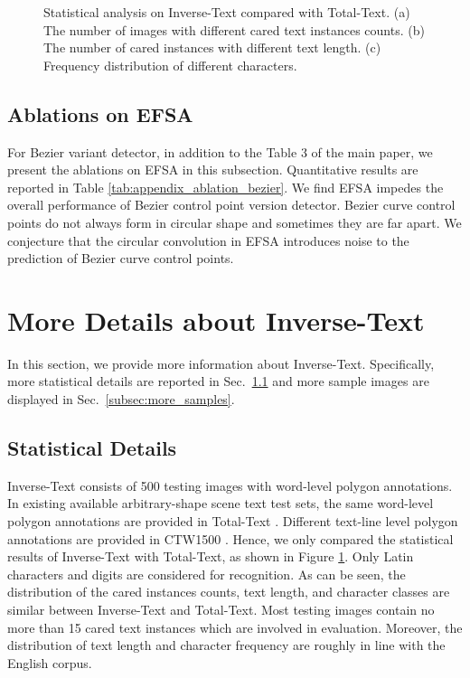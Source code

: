 \documentclass[letterpaper]{article} \usepackage{aaai23}  \usepackage{times}  \usepackage{helvet}  \usepackage{courier}  \usepackage[hyphens]{url}  \usepackage{graphicx} \urlstyle{rm}
\begin{document}
\begin{figure}[!t]
    \centering
    \caption{Statistical analysis on Inverse-Text compared with Total-Text. (a) The number of images with different cared text instances counts. (b) The number of cared instances with different text length. (c) Frequency distribution of different characters.}
    \label{fig:appendix_statistic}
\end{figure}

\subsection{Ablations on EFSA}
For Bezier variant detector, in addition to the Table 3 of the main paper, we present the ablations on EFSA in this subsection. Quantitative results are reported in Table \ref{tab:appendix_ablation_bezier}. We find EFSA impedes the overall performance of Bezier control point version detector. Bezier curve control points do not always form in circular shape and sometimes they are far apart. We conjecture that the circular convolution in EFSA introduces noise to the prediction of Bezier curve control points.

\section{More Details about Inverse-Text}
In this section, we provide more information about Inverse-Text. Specifically, more statistical details are reported in Sec.~\ref{subsec:more_details} and more sample images are displayed in Sec.~\ref{subsec:more_samples}.

\subsection{Statistical Details}
\label{subsec:more_details}
Inverse-Text consists of 500 testing images with word-level polygon annotations. In existing available arbitrary-shape scene text test sets, the same word-level polygon annotations are provided in Total-Text \cite{ch2020total}. Different text-line level polygon annotations are provided in CTW1500 \cite{liu2019curved}. Hence, we only compared the statistical results of Inverse-Text with Total-Text, as shown in Figure \ref{fig:appendix_statistic}. Only Latin characters and digits are considered for recognition. As can be seen, the distribution of the cared instances counts, text length, and character classes are similar between Inverse-Text and Total-Text. Most testing images contain no more than 15 cared text instances which are involved in evaluation. Moreover, the distribution of text length and character frequency are roughly in line with the English corpus.
\end{document}

